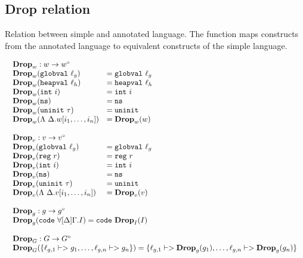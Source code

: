 \subsection{Drop relation}

Relation between simple and annotated language. The function maps constructs
from the annotated language to equivalent constructs of the simple language.

{\footnotesize
\[\begin{array}{l}
\begin{array}{ll}
\rlap{$\mathbf{Drop}_w : w -> w^\circ$} \\
\drop{w}{\mathtt{globval}\ \ell_g} &= \mathtt{globval}\ \ell_g \\
\drop{w}{\mathtt{heapval}\ \ell_h} &= \mathtt{heapval}\ \ell_h \\
\drop{w}{\mathtt{int}\ i} &= \mathtt{int}\ i \\
\drop{w}{\mathtt{ns}} &= \mathtt{ns} \\
\drop{w}{\mathtt{uninit}\ \tau} &= \mathtt{uninit} \\
\drop{w}{\Lambda\ \Delta.w[i_1, \dots, i_n]} &= \drop{w}{w} \\\\

\rlap{$\mathbf{Drop}_v : v -> v^\circ$} \\
\drop{v}{\mathtt{globval}\ \ell_g} &= \mathtt{globval}\ \ell_g \\
\drop{v}{\mathtt{reg}\ r} &= \mathtt{reg}\ r \\
\drop{v}{\mathtt{int}\ i} &= \mathtt{int}\ i \\
\drop{v}{\mathtt{ns}} &= \mathtt{ns} \\
\drop{v}{\mathtt{uninit}\ \tau} &= \mathtt{uninit} \\
\drop{v}{\Lambda\ \Delta.v[i_1, \dots, i_n]} &= \drop{v}{v}
\end{array} \\\\

\begin{array}{l}
\mathbf{Drop}_g : g -> g^\circ \\
\drop{g}{\mathtt{code}\ \forall[\Delta]\Gamma.I} = \mathtt{code}\ \drop{I}{I} \\\\

\mathbf{Drop}_G : G -> G^\circ \\
\drop{G}{\{\ell_{g,1} |-> g_1, \dots, \ell_{g,n} |-> g_n\}} = \{\ell_{g,1} |-> \drop{g}{g_1}, \dots, \ell_{g,n} |-> \drop{g}{g_n}\} \\\\


\end{array}
\end{array}\]}
